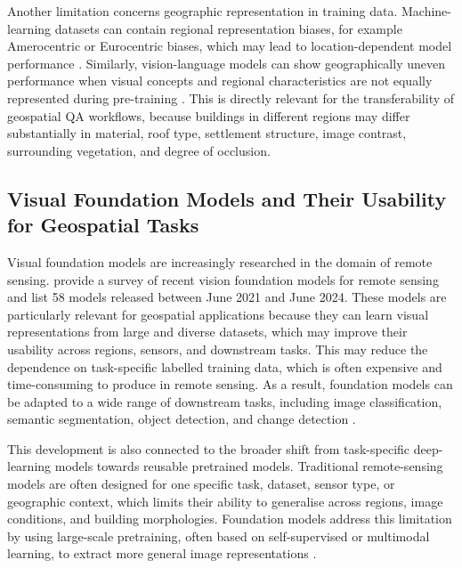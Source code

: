 Another limitation concerns geographic representation in training data. Machine-learning datasets can contain regional representation biases, for example Amerocentric or Eurocentric biases, which may lead to location-dependent model performance \citep{shankar2017classificationrepresentationassessinggeodiversity}. Similarly, vision-language models can show geographically uneven performance when visual concepts and regional characteristics are not equally represented during pre-training \citep{yin2023givlimprovinggeographicalinclusivity}. This is directly relevant for the transferability of geospatial QA workflows, because buildings in different regions may differ substantially in material, roof type, settlement structure, image contrast, surrounding vegetation, and degree of occlusion.
 
\subsection{Visual Foundation Models and Their Usability for Geospatial Tasks}

Visual foundation models are increasingly researched in the domain of remote sensing. \citet{lu2025visionfoundationmodelsremote} provide a survey of recent vision foundation models for remote sensing and list 58 models released between June 2021 and June 2024. These models are particularly relevant for geospatial applications because they can learn visual representations from large and diverse datasets, which may improve their usability across regions, sensors, and downstream tasks. This may reduce the dependence on task-specific labelled training data, which is often expensive and time-consuming to produce in remote sensing. As a result, foundation models can be adapted to a wide range of downstream tasks, including image classification, semantic segmentation, object detection, and change detection \citep{lu2025visionfoundationmodelsremote}.

This development is also connected to the broader shift from task-specific deep-learning models towards reusable pretrained models. Traditional remote-sensing models are often designed for one specific task, dataset, sensor type, or geographic context, which limits their ability to generalise across regions, image conditions, and building morphologies. Foundation models address this limitation by using large-scale pretraining, often based on self-supervised or multimodal learning, to extract more general image representations \citep{lu2025visionfoundationmodelsremote, huang2025surveyremotesensingfoundation}.

